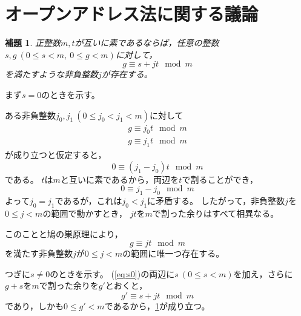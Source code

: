 \documentclass{article}
\makeatletter
\renewenvironment{proof}[1][\proofname]{\par
        \pushQED{\qed}
        \normalfont
        \topsep6\p@\@plus6\p@ \trivlist
        \item[\hskip\labelsep{\bfseries #1}\@addpunct{\bfseries}]\ignorespaces
    }{%
        \popQED\endtrivlist\@endpefalse
    }
\renewcommand{\proofname}{証明.}
\newtheorem{lemma}{補題}
\makeatother
\begin{document}
\section{オープンアドレス法に関する議論}

\begin{screen}
    \begin{lemma}
        \label{lemma:1}
        正整数$m, t$が互いに素であるならば，任意の整数$s, g\ (0 \leq s < m,\ 0 \leq g < m)$に対して，
        \begin{equation}
            g \equiv s + jt \mod{m}
        \end{equation}
        を満たすような非負整数$j$が存在する。
    \end{lemma}
\end{screen}

\begin{proof}
    まず$s = 0$のときを示す。

    ある非負整数$j_0, j_1\ (0 \leq j_0 < j_1 < m)$に対して
    \begin{align}
        g \equiv j_0 t \mod{m} \\
        g \equiv j_1 t \mod{m}
    \end{align}
    が成り立つと仮定すると，
    \begin{equation}
        0 \equiv (j_1 - j_0) t \mod{m}
    \end{equation}
    である。
    $t$は$m$と互いに素であるから，両辺を$t$で割ることができ，
    \begin{equation}
        0 \equiv j_1 - j_0 \mod{m}
    \end{equation}
    よって$j_0 = j_1$であるが，これは$j_0 < j_1$に矛盾する。
    したがって，非負整数$j$を$0 \leq j < m$の範囲で動かすとき，
    $jt$を$m$で割った余りはすべて相異なる。

    このことと鳩の巣原理により，
    \begin{equation}
        \label{eq:s0}
        g \equiv jt \mod{m}
    \end{equation}
    を満たす非負整数$j$が$0 \leq j < m$の範囲に唯一つ存在する。

    つぎに$s \neq 0$のときを示す。
    (\ref{eq:s0})の両辺に$s\ (0 \leq s < m)$を加え，さらに$g + s$を$m$で割った余りを$g'$とおくと，
    \begin{equation}
        g' \equiv s + jt \mod{m}
    \end{equation}
    であり，しかも$0 \leq g' < m$であるから，\cref{lemma:1}が成り立つ。
\end{proof}

\end{document}
